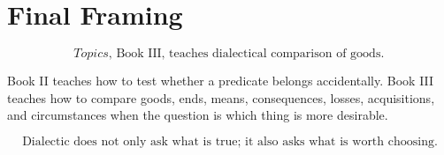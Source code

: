 \documentclass[12pt]{article}
\begin{document}
\section*{Final Framing}

\[
\boxed{
\textit{Topics}, \text{ Book III, teaches dialectical comparison of goods.}
}
\]

Book II teaches how to test whether a predicate belongs accidentally. Book III
teaches how to compare goods, ends, means, consequences, losses, acquisitions,
and circumstances when the question is which thing is more desirable.

\[
\boxed{
\text{Dialectic does not only ask what is true; it also asks what is worth choosing.}
}
\]
\end{document}
